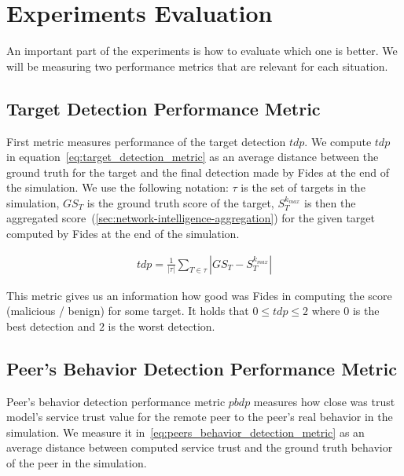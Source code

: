 \section{Experiments Evaluation}
\label{sec:experiments-evaluation}

An important part of the experiments is how to evaluate which one is better. We will be measuring two performance metrics that are relevant for each situation.

\subsection{Target Detection Performance Metric}
\label{subsec:target-detection-performance-metric}
First metric measures performance of the target detection $tdp$.
We compute $tdp$ in equation~\ref{eq:target_detection_metric} as an average distance between the ground truth for the target and the final detection made by Fides at the end of the simulation.
We use the following notation: $\tau$ is the set of targets in the simulation, $GS_{T}$ is the ground truth score of the target, $S^{k_{max}}_{T}$ is then the aggregated score~(\ref{sec:network-intelligence-aggregation}) for the given target computed by Fides at the end of the simulation.

\begin{equation}
\begin{split}
    tdp = \frac{1}{|\tau|} \sum_{T \in \tau}\left|GS_{T} - S^{k_{max}}_{T} \right|
\end{split}
\label{eq:target_detection_metric}
\end{equation}

\noindent
This metric gives us an information how good was Fides in computing the score (malicious / benign) for some target.
It holds that $0 \leq tdp \leq 2$ where $0$ is the best detection and $2$ is the worst detection.

\subsection{Peer's Behavior Detection Performance Metric}
\label{subsec:peers-behavior-detection-performance-metric}

Peer's behavior detection performance metric $pbdp$ measures how close was trust model's service trust value for the remote peer to the peer's real behavior in the simulation.
We measure it in~\ref{eq:peers_behavior_detection_metric} as an average distance between computed service trust and the ground truth behavior of the peer in the simulation.


